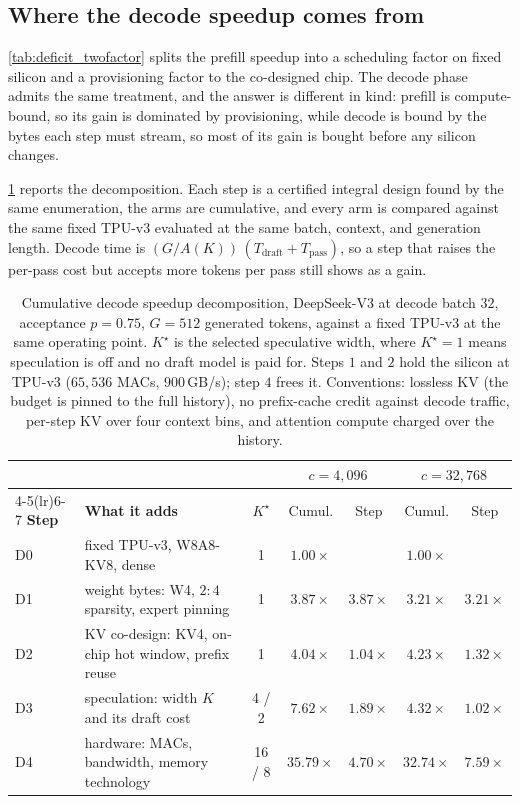 \subsection{Where the decode speedup comes from}
\label{sec:decode_decomp}

\cref{tab:deficit_twofactor} splits the prefill speedup into a scheduling factor
on fixed silicon and a provisioning factor to the co-designed chip. The decode
phase admits the same treatment, and the answer is different in kind: prefill is
compute-bound, so its gain is dominated by provisioning, while decode is bound
by the bytes each step must stream, so most of its gain is bought before any
silicon changes.

\cref{tab:decode_decomp} reports the decomposition. Each step is a certified
integral design found by the same enumeration, the arms are cumulative, and
every arm is compared against the same fixed TPU-v3 evaluated at the same batch,
context, and generation length. Decode time is
$(G/A(K))\,(T_{\mathrm{draft}}+T_{\mathrm{pass}})$, so a step that raises the
per-pass cost but accepts more tokens per pass still shows as a gain.

\begin{table}[ht!]
\centering
\caption{Cumulative decode speedup decomposition, DeepSeek-V3 at decode batch
$32$, acceptance $p=0.75$, $G=512$ generated tokens, against a fixed TPU-v3 at
the same operating point. $K^\star$ is the selected speculative width, where
$K^\star{=}1$ means speculation is off and no draft model is paid for. Steps
$1$ and $2$ hold the silicon at TPU-v3 ($65{,}536$ MACs, $900$\,GB/s); step $4$
frees it. Conventions: lossless KV (the budget is pinned to the full history),
no prefix-cache credit against decode traffic, per-step KV over four context
bins, and attention compute charged over the history.}
\label{tab:decode_decomp}
\small
\begin{tabular}{@{}llccccc@{}}
\toprule
& & & \multicolumn{2}{c}{$c=4{,}096$} & \multicolumn{2}{c}{$c=32{,}768$} \\
\cmidrule(lr){4-5}\cmidrule(lr){6-7}
\textbf{Step} & \textbf{What it adds} & $K^\star$ & Cumul. & Step
& Cumul. & Step \\
\midrule
D0 & fixed TPU-v3, W8A8-KV8, dense & 1 & $1.00\times$ & & $1.00\times$ & \\
D1 & weight bytes: W4, $2{:}4$ sparsity, expert pinning & 1 &
   $3.87\times$ & $3.87\times$ & $3.21\times$ & $3.21\times$ \\
D2 & KV co-design: KV4, on-chip hot window, prefix reuse & 1 &
   $4.04\times$ & $1.04\times$ & $4.23\times$ & $1.32\times$ \\
D3 & speculation: width $K$ and its draft cost & 4 / 2 &
   $7.62\times$ & $1.89\times$ & $4.32\times$ & $1.02\times$ \\
D4 & hardware: MACs, bandwidth, memory technology & 16 / 8 &
   $\mathbf{35.79\times}$ & $4.70\times$ & $\mathbf{32.74\times}$ & $7.59\times$ \\
\bottomrule
\end{tabular}
\end{table}

